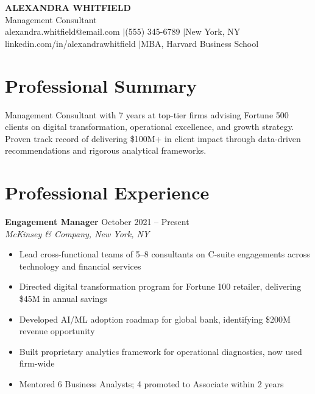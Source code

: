 \documentclass[11pt,a4paper]{article}
\begin{document}
\begin{center}
{\LARGE\bfseries\color{accent} ALEXANDRA WHITFIELD}\\[0.4em]
{\large Management Consultant}\\[0.4em]
{\small alexandra.whitfield@email.com \quad$\vert$\quad (555) 345-6789 \quad$\vert$\quad New York, NY}\\[0.2em]
{\small linkedin.com/in/alexandrawhitfield \quad$\vert$\quad MBA, Harvard Business School}
\end{center}

\section{Professional Summary}
Management Consultant with 7 years at top-tier firms advising Fortune 500 clients on digital transformation, operational excellence, and growth strategy. Proven track record of delivering \$100M+ in client impact through data-driven recommendations and rigorous analytical frameworks.

\section{Professional Experience}

\noindent\textbf{Engagement Manager} \hfill October 2021 -- Present\\
\textit{McKinsey \& Company, New York, NY}
\begin{itemize}[leftmargin=1.5em,nosep,label={\color{accent}\textendash}]
\item Lead cross-functional teams of 5--8 consultants on C-suite engagements across technology and financial services
\item Directed digital transformation program for Fortune 100 retailer, delivering \$45M in annual savings
\item Developed AI/ML adoption roadmap for global bank, identifying \$200M revenue opportunity
\item Built proprietary analytics framework for operational diagnostics, now used firm-wide
\item Mentored 6 Business Analysts; 4 promoted to Associate within 2 years
\end{itemize}
\vspace{0.5em}
\end{document}
